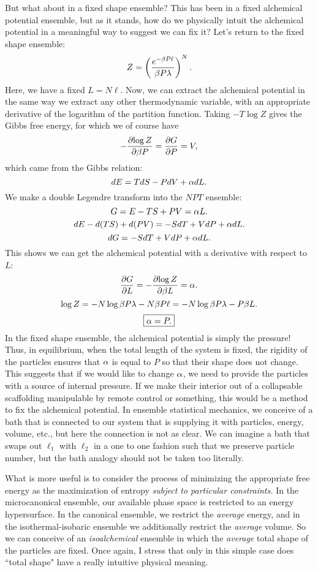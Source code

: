 \documentclass[12pt]{article}
\begin{document}
But what about in a fixed shape ensemble? This has been in a fixed alchemical potential ensemble, but as it stands, how do we physically intuit the alchemical potential in a meaningful way to suggest we can fix it? Let's return to the fixed shape ensemble:
\[ Z = \left(\frac{e^{-\beta P \ell}}{\beta P \lambda}\right)^N. \]
Here, we have a fixed $L = N\ell$. Now, we can extract the alchemical potential in the same way we extract any other thermodynamic variable, with an appropriate derivative of the logarithm of the partition function. Taking $-T \log Z$ gives the Gibbs free energy, for which we of course have
\[ -\frac{\partial {\log Z}}{\partial {\beta P}} = \frac{\partial {G}}{\partial {P}} = V,\]
which came from the Gibbs relation:
\[ dE = TdS - PdV + \alpha dL.\]
We make a double Legendre transform into the $NPT$ ensemble:
\[ G = E - TS + PV = \alpha L.\]
\[ dE - d(TS) + d(PV) = -S dT + VdP + \alpha dL.\]
\[ dG = -S dT + V dP + \alpha dL.\]
This shows we can get the alchemical potential with a derivative with respect to $L$:
\[ \frac{\partial {G}}{\partial {L}} = -\frac{\partial {\log Z}}{\partial {\beta L}} = \alpha.\]
\[ \log Z = -N\log \beta P \lambda - N \beta P \ell = -N \log \beta P \lambda - P \beta L.\]
\[ \boxed{ \alpha = P.}\]
In the fixed shape ensemble, the alchemical potential is simply the pressure! Thus, in equilibrium, when the total length of the system is fixed, the rigidity of the particles ensures that $\alpha$ is equal to $P$ so that their shape does not change. This suggests that if we would like to change $\alpha$, we need to provide the particles with a source of internal pressure. If we make their interior out of a collapsable scaffolding manipulable by remote control or something, this would be a method to fix the alchemical potential. In ensemble statistical mechanics, we conceive of a bath that is connected to our system that is supplying it with particles, energy, volume, etc., but here the connection is not as clear. We can imagine a bath that swaps out $\ell_1$ with $\ell_2$ in a one to one fashion such that we preserve particle number, but the bath analogy should not be taken too literally.

What is more useful is to consider the process of minimizing the appropriate free energy as the maximization of entropy \emph{subject to particular constraints.} In the microcanonical ensemble, our available phase space is restricted to an energy hypersurface. In the canonical ensemble, we restrict the \emph{average} energy, and in the isothermal-isobaric ensemble we additionally restrict the \emph{average} volume. So we can conceive of an \emph{isoalchemical} ensemble in which the \emph{average} total shape of the particles are fixed. Once again, I stress that only in this simple case does ``total shape" have a really intuitive physical meaning.
\end{document}
